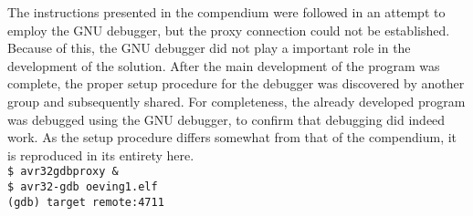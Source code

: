 The instructions presented in the compendium were followed in an attempt to employ the GNU debugger, but the proxy connection could not be established.
Because of this, the GNU debugger did not play a important role in the development of the solution.
After the main development of the program was complete, the proper setup procedure for the debugger was discovered by another group and subsequently shared.
For completeness, the already developed program was debugged using the GNU debugger, to confirm that debugging did indeed work.
As the setup procedure differs somewhat from that of the compendium, it is reproduced in its entirety here.
\\
\texttt{\$ avr32gdbproxy \&\\
\$ avr32-gdb oeving1.elf \\
(gdb) target remote:4711}
